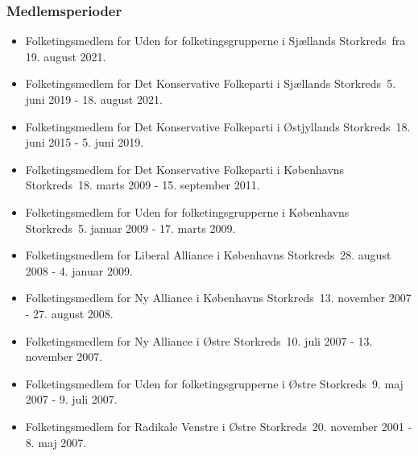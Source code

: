 \documentclass[11pt, a4paper]{awesome-cv}
\begin{document}
\begin{cvletter}
\subsubsection*{Medlemsperioder}
\begin{itemize}
\item Folketingsmedlem for Uden for folketingsgrupperne i Sjællands Storkreds fra 19. august 2021.
\item Folketingsmedlem for Det Konservative Folkeparti i Sjællands Storkreds 5. juni 2019 - 18. august 2021.
\item Folketingsmedlem for Det Konservative Folkeparti i Østjyllands Storkreds 18. juni 2015 - 5. juni 2019.
\item Folketingsmedlem for Det Konservative Folkeparti i Københavns Storkreds 18. marts 2009 - 15. september 2011.
\item Folketingsmedlem for Uden for folketingsgrupperne i Københavns Storkreds 5. januar 2009 - 17. marts 2009.
\item Folketingsmedlem for Liberal Alliance i Københavns Storkreds 28. august 2008 - 4. januar 2009.
\item Folketingsmedlem for Ny Alliance i Københavns Storkreds 13. november 2007 - 27. august 2008.
\item Folketingsmedlem for Ny Alliance i Østre Storkreds 10. juli 2007 - 13. november 2007.
\item Folketingsmedlem for Uden for folketingsgrupperne i Østre Storkreds 9. maj 2007 - 9. juli 2007.
\item Folketingsmedlem for Radikale Venstre i Østre Storkreds 20. november 2001 - 8. maj 2007.
\end{itemize}

\end{cvletter}
\end{document}
